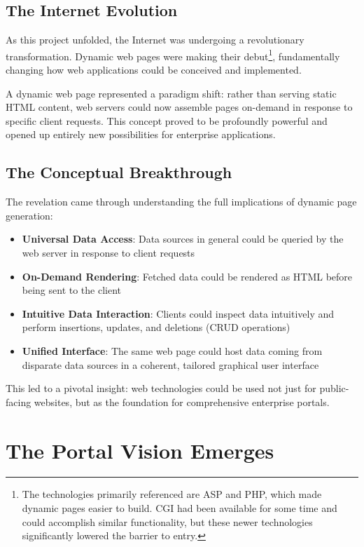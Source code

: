 \subsection{The Internet Evolution}

As this project unfolded, the Internet was undergoing a revolutionary transformation. Dynamic web pages were making their debut\footnote{The technologies primarily referenced are ASP and PHP, which made dynamic pages easier to build. CGI had been available for some time and could accomplish similar functionality, but these newer technologies significantly lowered the barrier to entry.}, fundamentally changing how web applications could be conceived and implemented.

A dynamic web page represented a paradigm shift: rather than serving static HTML content, web servers could now assemble pages on-demand in response to specific client requests. This concept proved to be profoundly powerful and opened up entirely new possibilities for enterprise applications.

\subsection{The Conceptual Breakthrough}

The revelation came through understanding the full implications of dynamic page generation:

\begin{itemize}
\item \textbf{Universal Data Access}: Data sources in general could be queried by the web server in response to client requests
\item \textbf{On-Demand Rendering}: Fetched data could be rendered as HTML before being sent to the client
\item \textbf{Intuitive Data Interaction}: Clients could inspect data intuitively and perform insertions, updates, and deletions (CRUD operations)
\item \textbf{Unified Interface}: The same web page could host data coming from disparate data sources in a coherent, tailored graphical user interface
\end{itemize}

This led to a pivotal insight: web technologies could be used not just for public-facing websites, but as the foundation for comprehensive enterprise portals.

\section{The Portal Vision Emerges}

